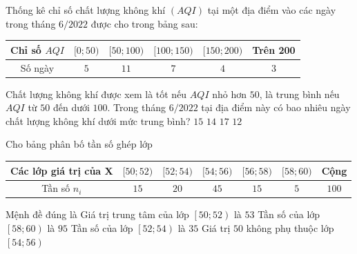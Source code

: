 \begin{ex}%
	Thống kê chỉ số chất lượng không khí $(AQI)$ tại một địa điểm vào các ngày trong tháng $6 / 2022$  được cho trong bảng sau:
	\begin{center}
		\begin{tabular}{|c|c|c|c|c|c|}
			\hline Chỉ số $AQI$ & {$[0;  50)$} & {$[50; 100)$} & {$[100; 150)$} & {$[150; 200)$} & Trên 200 \\
			\hline  Số ngày & $5$ & $11$ & $7$ & $4$ & $3$ \\
			 \hline
		\end{tabular}
	\end{center}
	 Chất lượng không khí được xem là tốt nếu $AQI$ nhỏ hơn $50$, là trung bình nếu $AQI$ từ $50$ đến dưới $100$. Trong tháng $6/2022$ tại địa điểm này có bao nhiêu ngày chất lượng không khí dưới mức trung bình?
	 \choice
		 {$15$}
		 {\True $14$}
		 {$17$}
		{$12$} 
\end{ex}

\begin{ex}%
	Cho bảng phân bố tần  số ghép lớp
	\begin{center}
		\begin{tabular}{|c|c|c|c|c|c|c|}
			\hline Các lớp giá trị của X & {$[50; 52)$} & {$[52; 54)$} & {$[54; 56)$} & {$[56; 58)$}  & {$[58; 60)$} & Cộng \\
			\hline Tần số $n_i$ & $15$  & $20$ & $45$ & $15$ & $5$ & $100$ \\
			\hline 
		\end{tabular}
	\end{center}
	 Mệnh đề đúng là
	\choice 
		{Giá trị  trung tâm của lớp $\left[50;52\right)$ là $53$}
		{Tần số của lớp $\left[58;60\right)$ là  $95$}
		{Tần số của lớp $\left[52;54\right)$  là $35$}
		{\True Giá trị $50$ không phụ thuộc lớp $\left[54;56\right)$} 
	\loigiai{Vì $50\in  \left[54;56\right)$.
	} 
\end{ex}


